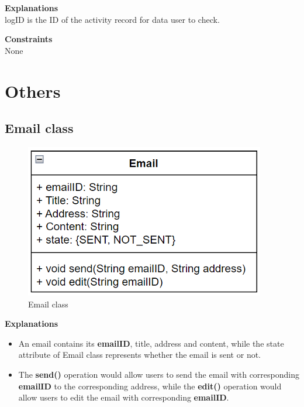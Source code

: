 \textbf{Explanations} \\
logID is the ID of the activity record for data user to check.

\textbf{Constraints} \\
None


\section{Others}

\subsection{Email class}
\begin{figure}[H]
    \centering
    \includegraphics[width=0.5\linewidth]{picture/3-5/3-5-1.png}
    \caption{Email class}
    \label{fig:enter-label}
\end{figure}

\textbf{Explanations}
\begin{itemize}
    \item An email contains its \textbf{emailID}, title, address and content, while the state attribute of Email class represents whether the email is sent or not. 
    \item The \textbf{send()} operation would allow users to send the email with corresponding \textbf{emailID} to the corresponding address, while the \textbf{edit()} operation would allow users to edit the email with corresponding \textbf{emailID}. 
\end{itemize}

